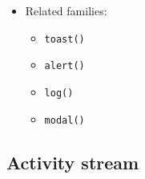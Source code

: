 \begin{itemize}
  \begin{itemize}
  \tightlist
  \item
    rich: stacked overlays with placement, action buttons, animation, and archive/history
  \item
    static: visible notices plus accessible history review surface
  \item
    pipe: lower to ordered event lines and routed warnings/errors
  \item
    accessible: simplify to explicit chronological reviewable notices with actions described in text
  \end{itemize}
\item
  Related families:

  \begin{itemize}
  \tightlist
  \item
    \texttt{t\allowbreak{}o\allowbreak{}a\allowbreak{}s\allowbreak{}t\allowbreak{}(\allowbreak{})}
  \item
    \texttt{a\allowbreak{}l\allowbreak{}e\allowbreak{}r\allowbreak{}t\allowbreak{}(\allowbreak{})}
  \item
    \texttt{l\allowbreak{}o\allowbreak{}g\allowbreak{}(\allowbreak{})}
  \item
    \texttt{m\allowbreak{}o\allowbreak{}d\allowbreak{}a\allowbreak{}l\allowbreak{}(\allowbreak{})}
  \end{itemize}
\end{itemize}

\subsection{Activity stream}\label{record-019-activity-stream}


